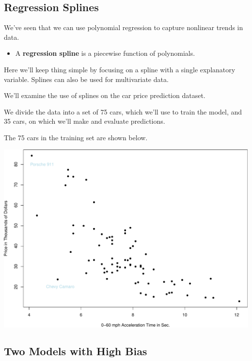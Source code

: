 \documentclass[
  letterpaper,
  DIV=11,
  numbers=noendperiod]{scrreprt}
\providecommand{\tightlist}{%
  \setlength{\itemsep}{0pt}\setlength{\parskip}{0pt}}\usepackage{longtable,booktabs,array}
\begin{document}
\subsection{Regression Splines}\label{regression-splines-1}

We've seen that we can use polynomial regression to capture nonlinear
trends in data.

\begin{itemize}
\tightlist
\item
  A \textbf{regression spline} is a piecewise function of polynomials.
\end{itemize}

Here we'll keep thing simple by focusing on a spline with a single
explanatory variable. Splines can also be used for multivariate data.

We'll examine the use of splines on the car price prediction dataset.

We divide the data into a set of 75 cars, which we'll use to train the
model, and 35 cars, on which we'll make and evaluate predictions.

The 75 cars in the training set are shown below.

\includegraphics{Ch7_files/figure-pdf/unnamed-chunk-66-1.pdf}

\subsection{Two Models with High Bias}\label{two-models-with-high-bias}
\end{document}

